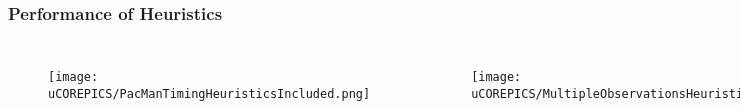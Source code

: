 \documentclass{beamer}
\begin{document}

\begin{frame}
\frametitle{Performance of Heuristics}

\begin{columns}[c]

\begin{figure}

\texttt{[image: uCOREPICS/PacManTimingHeuristicsIncluded.png]}
\end{figure}

\begin{figure}
\texttt{[image: uCOREPICS/MultipleObservationsHeuristics.png]}
\end{figure}

\begin{figure}
\texttt{[image: lucasplots/monImages/doubleLoopImageMO.png]}
\end{figure}

\end{columns}

\end{frame}
\end{document}
